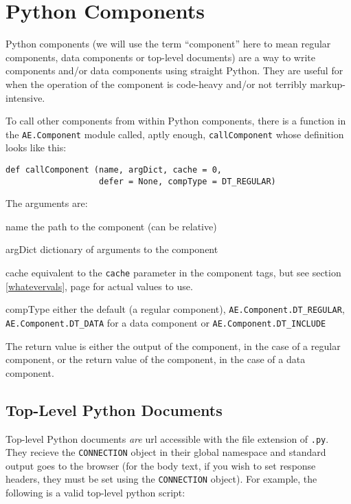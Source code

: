 \documentclass{manual}
\begin{document}
\chapter{Python Components}
\label{pythoncode}
Python components (we will use the term ``component'' here to mean
regular components, data components or top-level documents) 
are a way to write components and/or data components using straight
Python.  They are useful for when the operation of the component is
code-heavy and/or not terribly markup-intensive.

To call other components from within Python components, there is a
function in the \texttt{AE.Component} module called, aptly enough,
\texttt{callComponent} whose definition looks like this:

\begin{verbatim}
def callComponent (name, argDict, cache = 0,
                   defer = None, compType = DT_REGULAR)
\end{verbatim}

The arguments are:
\begin{argdesc}
\item[name] the path to the component (can be relative)
\item[argDict] dictionary of arguments to the component
\item[cache] equivalent to the \texttt{cache} parameter in the
component tags, but see section \ref{whatevervals}, page
\pageref{whatevervals} for actual values to use.
\item[compType] either the default (a regular
component), \texttt{AE.Component.DT_REGULAR},
\texttt{AE.Component.DT_DATA} for a data component or
\texttt{AE.Component.DT_INCLUDE}
\end{argdesc}



The return value is either the output of the component, in the case of
a regular component, or the return value of the component, in the case
of a data component.





\section{Top-Level Python Documents}
\label{pythontl}
Top-level Python documents \emph{are} url accessible with the file
extension of \texttt{.py}.  They recieve
the \texttt{CONNECTION} object in their global
namespace and standard output goes to the browser (for the body text, if
you wish to set response headers, they must be set using the
\texttt{CONNECTION} object).  For example, the following is a valid
top-level python script: 
\end{document}
